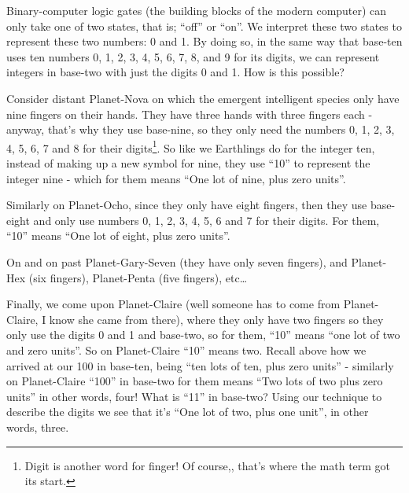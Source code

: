 \documentclass{article}
\begin{document}
Binary-computer logic gates (the building blocks of the modern computer)
can only take one of two states, that is; ``off'' or ``on''.
We interpret these two states to represent these two numbers: 0 and 1.
By doing so, in the same way that base-ten uses ten numbers 0,
1, 2, 3, 4, 5, 6, 7, 8, and 9 for its digits, we can represent integers
in base-two with just the digits 0 and 1. How is this possible?

Consider distant Planet-Nova on which the emergent
intelligent species only have nine fingers on their hands.
They have three hands with three fingers each - anyway,
that's why they use base-nine, so they only need the numbers 0,
1, 2, 3, 4, 5, 6, 7 and 8 for their digits\footnote{Digit
is another word for finger! Of course,, that's where the math term got its start.}.
So like we Earthlings do for the integer ten,
instead of making up a new symbol for nine,
they use ``10'' to represent the integer nine - which
for them means ``One lot of nine, plus zero units''.

Similarly on Planet-Ocho, since they only have eight fingers,
then they use base-eight and only use numbers 0, 1,
2, 3, 4, 5, 6 and 7 for their digits. For them, ``10''
means ``One lot of eight, plus zero units''.

On and on past Planet-Gary-Seven (they have only seven fingers),
and Planet-Hex (six fingers), Planet-Penta (five fingers), etc\dots{}

Finally, we come upon Planet-Claire (well someone
has to come from Planet-Claire,
I know she came from there),
where they only have two fingers
so they only use the digits 0 and 1 and base-two,
so for them, ``10'' means ``one lot of two and zero units''.
So on Planet-Claire ``10'' means two.
Recall above how we arrived at our 100 in base-ten,
being ``ten lots of ten,
plus zero units'' - similarly on Planet-Claire ``100''
in base-two for them means ``Two lots of two plus zero units'' in other words,
four! What is ``11'' in base-two? Using our technique to
describe the digits we see that it's ``One lot of two, plus one unit'',
in other words, three.
\end{document}
